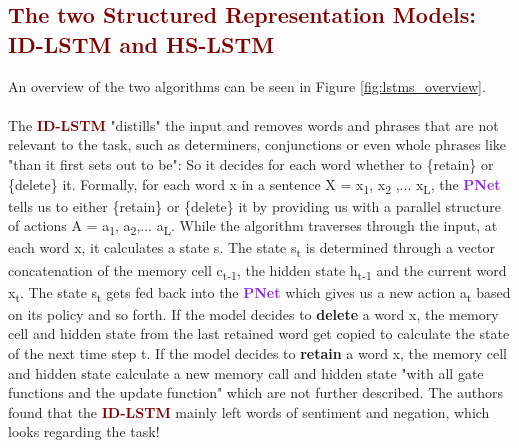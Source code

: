 \documentclass{article}
\begin{document}
\subsection{\textcolor{Maroon}{The two Structured Representation Models: ID-LSTM and HS-LSTM}} \label{sec:models}
An overview of the two algorithms can be seen in Figure \ref{fig:lstms_overview}.\\\\
The \textcolor{Maroon}{\textbf{ID-LSTM}} "distills" the input and removes words and phrases that are not relevant to the task, such as determiners, conjunctions or even whole phrases like "than it first sets out to be": So it decides for each word whether to \{retain\} or \{delete\} it. Formally, for each word x in a sentence X = x\textsubscript{1}, x\textsubscript{2} ,... x\textsubscript{L}, the \textcolor{BlueViolet}{\textbf{PNet}} tells us to either \{retain\} or \{delete\} it by providing us with a parallel structure of actions A = a\textsubscript{1}, a\textsubscript{2},... a\textsubscript{L}. While the algorithm traverses through the input, at each word x, it calculates a state s. The state s\textsubscript{t} is determined through a vector concatenation of the memory cell c\textsubscript{t-1}, the hidden state h\textsubscript{t-1} and the current word x\textsubscript{t}. The state s\textsubscript{t} gets fed back into the \textcolor{BlueViolet}{\textbf{PNet}} which gives us a new action a\textsubscript{t} based on its policy and so forth. If the model decides to \textbf{delete} a word x, the memory cell and hidden state from the last retained word get copied to calculate the state of the next time step t. If the model decides to \textbf{retain} a word x, the memory cell and hidden state calculate a new memory call and hidden state "with all gate functions and the update function" which are not further described. The authors found that the \textcolor{Maroon}{\textbf{ID-LSTM}} mainly left words of sentiment and negation, which looks regarding the task!\\\\
\end{document}
